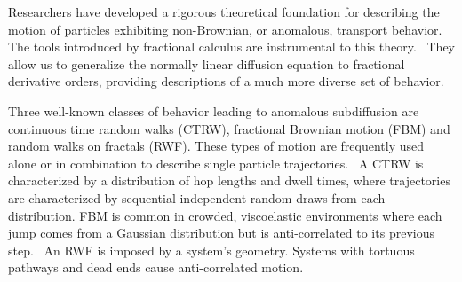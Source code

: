 \documentclass{article}
\begin{document}
%  
  
  Researchers have developed a rigorous theoretical foundation for describing the 
  motion of particles exhibiting non-Brownian, or anomalous, transport behavior.
  \cite{metzler_random_2000,bouchaud_anomalous_1990} The tools introduced by 
  fractional calculus are instrumental to this theory.~\cite{gorenflo_fractional_1997}
  They allow us to generalize the normally linear diffusion equation to fractional
  derivative orders, providing descriptions of a much more diverse set of behavior.~\cite{klages_anomalous_2008}

  Three well-known classes of behavior leading to anomalous subdiffusion are 
  continuous time random walks (CTRW), fractional Brownian motion
  (FBM) and random walks on fractals (RWF).\cite{meroz_toolbox_2015}
  These types of motion are frequently used alone or in combination to describe
  single particle trajectories.~\cite{morrin_three_2018,metzler_anomalous_2014}
  A CTRW is characterized by a distribution of hop lengths and dwell times, 
  where trajectories are characterized by sequential independent random draws from 
  each distribution.\cite{montroll_random_1965} FBM is common in crowded,
  viscoelastic environments where each jump comes from a Gaussian distribution
  but is anti-correlated to its previous step.~\cite{mandelbrot_fractional_1968,jeon_fractional_2010,banks_anomalous_2005}
  An RWF is imposed by a system's geometry. Systems with tortuous pathways 
  and dead ends cause anti-correlated motion.\cite{meroz_toolbox_2015,neusius_subdiffusion_2008}
\end{document}
